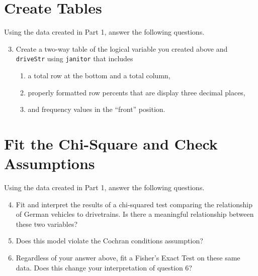 \documentclass{tufte-handout}
\begin{document}
\section{Create Tables}
Using the data created in Part 1, answer the following questions. 
\begin{enumerate}
\setcounter{enumi}{2}
\item Create a two-way table of the logical variable you created above and \texttt{driveStr} using \texttt{janitor} that includes 
\begin{enumerate}
\item a total row at the bottom and a total column,
\item properly formatted row percents that are display three decimal places,
\item and frequency values in the ``front'' position.
\end{enumerate}
\end{enumerate}

\vspace{5mm}
\section{Fit the Chi-Square and Check Assumptions} 
Using the data created in Part 1, answer the following questions. 
\begin{enumerate}
\setcounter{enumi}{3}
\item Fit and interpret the results of a chi-squared test comparing the relationship of German vehicles to drivetrains. Is there a meaningful relationship between these two variables?
\item Does this model violate the Cochran conditions assumption?
\item Regardless of your answer above, fit a Fisher's Exact Test on these same data. Does this change your interpretation of question 6?
\end{enumerate}

\end{document}
